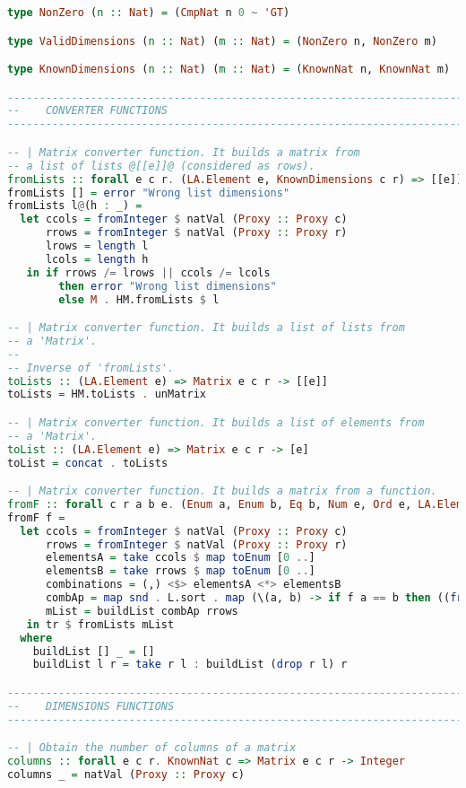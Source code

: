 \documentclass[
  oneside,
  11pt, a4paper,
  footinclude=true,
  headinclude=true,
  cleardoublepage=empty
]{scrbook}
\theoremstyle{definition}
\theoremstyle{definition}
\begin{document}
\begin{lstlisting}[language=Haskell, caption={Matrix.Internal},captionpos=b]
type NonZero (n :: Nat) = (CmpNat n 0 ~ 'GT)

type ValidDimensions (n :: Nat) (m :: Nat) = (NonZero n, NonZero m)

type KnownDimensions (n :: Nat) (m :: Nat) = (KnownNat n, KnownNat m)

-------------------------------------------------------------------------------
--    CONVERTER FUNCTIONS
-------------------------------------------------------------------------------

-- | Matrix converter function. It builds a matrix from
-- a list of lists @[[e]]@ (considered as rows).
fromLists :: forall e c r. (LA.Element e, KnownDimensions c r) => [[e]] -> Matrix e c r
fromLists [] = error "Wrong list dimensions"
fromLists l@(h : _) =
  let ccols = fromInteger $ natVal (Proxy :: Proxy c)
      rrows = fromInteger $ natVal (Proxy :: Proxy r)
      lrows = length l
      lcols = length h
   in if rrows /= lrows || ccols /= lcols
        then error "Wrong list dimensions"
        else M . HM.fromLists $ l

-- | Matrix converter function. It builds a list of lists from
-- a 'Matrix'.
--
-- Inverse of 'fromLists'.
toLists :: (LA.Element e) => Matrix e c r -> [[e]]
toLists = HM.toLists . unMatrix

-- | Matrix converter function. It builds a list of elements from
-- a 'Matrix'.
toList :: (LA.Element e) => Matrix e c r -> [e]
toList = concat . toLists

-- | Matrix converter function. It builds a matrix from a function.
fromF :: forall c r a b e. (Enum a, Enum b, Eq b, Num e, Ord e, LA.Element e, KnownNat c, KnownNat r) => (a -> b) -> Matrix e c r
fromF f =
  let ccols = fromInteger $ natVal (Proxy :: Proxy c)
      rrows = fromInteger $ natVal (Proxy :: Proxy r)
      elementsA = take ccols $ map toEnum [0 ..]
      elementsB = take rrows $ map toEnum [0 ..]
      combinations = (,) <$> elementsA <*> elementsB
      combAp = map snd . L.sort . map (\(a, b) -> if f a == b then ((fromEnum a, fromEnum b), 1) else ((fromEnum a, fromEnum b), 0)) $ combinations
      mList = buildList combAp rrows
   in tr $ fromLists mList
  where
    buildList [] _ = []
    buildList l r = take r l : buildList (drop r l) r

-------------------------------------------------------------------------------
--    DIMENSIONS FUNCTIONS
-------------------------------------------------------------------------------

-- | Obtain the number of columns of a matrix
columns :: forall e c r. KnownNat c => Matrix e c r -> Integer
columns _ = natVal (Proxy :: Proxy c)


\end{lstlisting}
\end{document}
